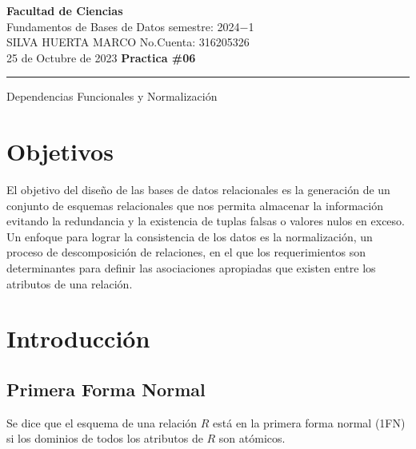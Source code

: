 \documentclass[a4paper,12pt]{article}
\begin{document}
\pagecolor{black}
\color{white}

\thispagestyle{firstpage} %
\noindent
\large\textbf{Facultad de Ciencias} \\
Fundamentos de Bases de Datos \hfill semestre: 2024$-$1 \\
\textsc{SILVA HUERTA MARCO}   \hfill No.Cuenta: 316205326    \\
25 de Octubre de 2023      \hfill \textbf{Practica \#06}    \\
\noindent\rule{7.3in}{2.8pt}

\begin{center}
\textcolor{sun}{\Large{Dependencias Funcionales y Normalización}}
\end{center}

\section{Objetivos}

El objetivo del diseño de las bases de datos relacionales es la generación de un conjunto de esquemas relacionales que nos permita almacenar la información evitando la redundancia y la existencia de tuplas falsas o valores nulos en exceso. Un enfoque para lograr la consistencia de los datos es la normalización, un proceso de descomposición de relaciones, en el que los requerimientos son determinantes para definir las asociaciones apropiadas que existen entre los atributos de una relación.

\section{Introducción}

\subsection{Primera Forma Normal}

Se dice que el esquema de una relación \(R\) está en la primera forma normal (1FN) si los dominios de todos los atributos de \(R\) son atómicos.
\end{document}
